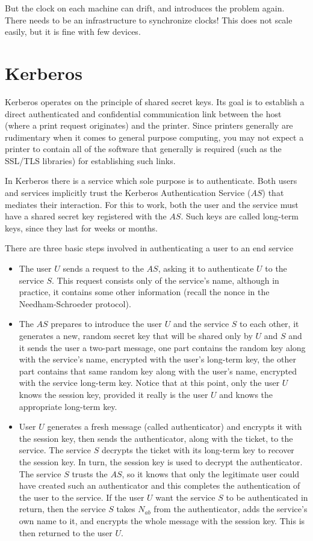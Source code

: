 But the clock on each machine can drift, and introduces the problem again. There needs to be an infrastructure to synchronize clocks! This does not scale easily, but it is fine with few devices.

\section{Kerberos}
Kerberos operates on the principle of shared secret keys. Its goal is to establish a direct authenticated and confidential communication link between the host (where a print request originates) and the printer. Since printers generally are rudimentary when it comes to general purpose computing, you may not expect a printer to contain all of the software that generally is required (such as the SSL/TLS libraries) for establishing such links.

In Kerberos there is a service which sole purpose is to authenticate. Both users and services implicitly trust the Kerberos Authentication Service ($AS$) that mediates their interaction. For this to work, both the user and the service must have a shared secret key registered with the $AS$. Such keys are called long-term keys, since they last for weeks or months.

There are three basic steps involved in authenticating a user to an end service
\begin{itemize}
	\item The user $U$ sends a request to the $AS$, asking it to authenticate $U$ to the service $S$. This request consists only of the service's name, although in practice, it contains some other information (recall the nonce in the Needham-Schroeder protocol).
	\item The $AS$ prepares to introduce the user $U$ and the service $S$ to each other, it generates a new, random secret key that will be shared only by $U$ and $S$ and it sends the user a two-part message, one part contains the random key along with the service's name, encrypted with the user's long-term key, the other part contains that same random key along with the user's name, encrypted with the service long-term key. Notice that at this point, only the user $U$ knows the session key, provided it really is the user $U$ and knows the appropriate long-term key.
	\item User $U$ generates a fresh message (called authenticator) and encrypts it with the session key, then sends the authenticator, along with the ticket, to the service. The service $S$ decrypts the ticket with its long-term key to recover the session key. In turn, the session key is used to decrypt the authenticator. The service $S$ trusts the $AS$, so it knows that only the legitimate user could have created such an authenticator and this completes the authentication of the user to the service. If the user $U$ want the service $S$ to be authenticated in return, then the service $S$ takes $N_{ab}$ from the authenticator, adds the service's own name to it, and encrypts the whole message with the session key. This is then returned to the user $U$.
\end{itemize}

